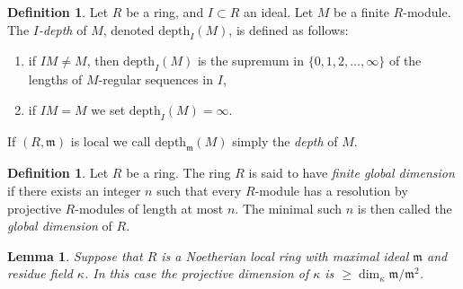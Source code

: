 \documentclass{amsart}
\theoremstyle{plain}
\newtheorem{lemma}[subsection]{Lemma}
\theoremstyle{definition}
\newtheorem{definition}[subsection]{Definition}
\theoremstyle{remark}
\numberwithin{equation}{subsection}
\begin{document}
\begin{definition}
\label{definition-depth}
Let $R$ be a ring, and $I \subset R$ an ideal. Let $M$ be a finite $R$-module.
The {\it $I$-depth} of $M$, denoted $\text{depth}_I(M)$, is defined as follows:
\begin{enumerate}
\item if $IM \not = M$, then $\text{depth}_I(M)$ is the supremum in
$\{0, 1, 2, \ldots, \infty\}$ of the lengths of $M$-regular sequences in $I$,
\item if $IM = M$ we set $\text{depth}_I(M) = \infty$.
\end{enumerate}
If $(R, \mathfrak m)$ is local we call $\text{depth}_{\mathfrak m}(M)$ simply
the {\it depth} of $M$.
\end{definition}

\begin{definition}
\label{definition-finite-gl-dim}
Let $R$ be a ring. The ring
$R$ is said to have {\it finite global dimension}
if there exists an integer $n$ such that
every $R$-module has a resolution by
projective $R$-modules of length at most $n$.
The minimal such $n$ is then called the {\it global dimension}
of $R$.
\end{definition}

\begin{lemma}
\label{lemma-length-resolution-residue-field}
Suppose that $R$ is a Noetherian local ring
with maximal ideal $\mathfrak m$ and
residue field $\kappa$. In this case
the projective dimension of $\kappa$ is
$\geq \dim_\kappa \mathfrak m / \mathfrak m^2$.
\end{lemma}
\end{document}
